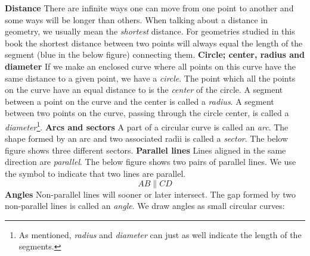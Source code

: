 \newpage
{}
\newpage
\textbf{Distance}\os
There are infinite ways one can move from one point to another and some ways will be longer than others. When talking about a distance in geometry, we usually mean the \textsl{shortest} distance. For geometries studied in this book the shortest distance between two points will always equal the length of the segment (blue in the below figure) connecting them.
\textbf{Circle; center, radius and diameter} \os
If we make an enclosed curve where all points on this curve have the same distance to a given point, we have a \textit{circle}. The point which all the points on the curve have an equal distance to is the \textit{center} of the circle. A segment between a point on the curve and the center is called a \textit{radius}. A segment between two points on the curve, passing through the circle center, is called a \textit{diameter}\footnote{As mentioned, \textit{radius} and \textit{diameter} can just as well indicate the length of the segments.}.
\textbf{Arcs and sectors} \os
A part of a circular curve is called an \textit{arc}. The shape formed by an arc and two associated radii is called a \textit{sector}. The below figure shows three different sectors.
\newpage
\textbf{Parallel lines}\os
Lines aligned in the same direction are \textit{parallel}. The below figure shows two pairs of parallel lines.
We use the symbol \sym{$ \parallel $} to indicate that two lines are parallel.
\[ AB\parallel CD \]
\textbf{Angles} \label{vinklar}\os
Non-parallel lines will sooner or later intersect. The gap formed  by two non-parallel lines is called an \textit{angle}. We draw angles as small circular curves:

